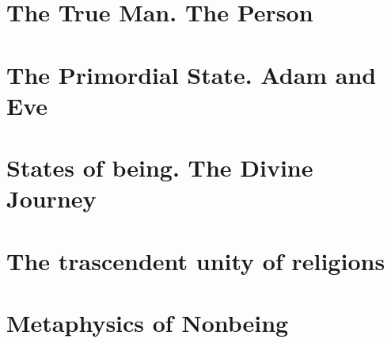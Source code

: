 \documentclass[a4paper,12pt,twoside]{book}
\begin{document}
\chapter{The True Man. The Person}












\chapter{The Primordial State. Adam and Eve}




\chapter{States of being. The Divine Journey}











\chapter{The trascendent unity of religions}







\chapter{Metaphysics of Nonbeing}




\end{document}
